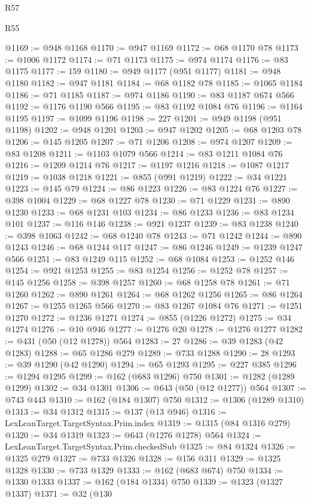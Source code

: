 \begin{lexlean}{R57}
\begin{lexlean}{R55}
\begin{coremodule}
{{{{{{{{{{{{{{{{{{{{{{{{{{{{{{{{{{{{{{{{{{{{{{{{{{{{{{{{{{{{{{@1169 := @948 @1168
@1170 := @947 @1169
@1172 := @68 @1170 @78
@1173 := @1006 @1172
@1174 := @71 @1173
@1175 := @974 @1174
@1176 := @83 @1175
@1177 := 159
@1180 := @949 @1177 (@951 @1177)
@1181 := @948 @1180
@1182 := @947 @1181
@1184 := @68 @1182 @78
@1185 := @1065 @1184
@1186 := @71 @1185
@1187 := @974 @1186
@1190 := @83 @1187 @674 @566
@1192 := @1176 @1190 @566
@1195 := @83 @1192 @1084 @76
@1196 := @1164 @1195
@1197 := @1099 @1196
@1198 := 227
@1201 := @949 @1198 (@951 @1198)
@1202 := @948 @1201
@1203 := @947 @1202
@1205 := @68 @1203 @78
@1206 := @145 @1205
@1207 := @71 @1206
@1208 := @974 @1207
@1209 := @83 @1208
@1211 := @1103 @1079 @566
@1214 := @83 @1211 @1084 @76
@1216 := @1209 @1214 @76
@1217 := @1197 @1216
@1218 := @1087 @1217
@1219 := @1038 @1218
@1221 := @855 (@991 @1219)
@1222 := @34 @1221
@1223 := @145 @79
@1224 := @86 @1223
@1226 := @83 @1224 @76
@1227 := @398 @1004
@1229 := @68 @1227 @78
@1230 := @71 @1229
@1231 := @890 @1230
@1233 := @68 @1231 @103
@1234 := @86 @1233
@1236 := @83 @1234 @101
@1237 := @116 @146
@1238 := @921 @1237
@1239 := @83 @1238
@1240 := @398 @1063
@1242 := @68 @1240 @78
@1243 := @71 @1242
@1244 := @890 @1243
@1246 := @68 @1244 @117
@1247 := @86 @1246
@1249 := @1239 @1247 @566
@1251 := @83 @1249 @115
@1252 := @68 @1084
@1253 := @1252 @146
@1254 := @921 @1253
@1255 := @83 @1254
@1256 := @1252 @78
@1257 := @145 @1256
@1258 := @398 @1257
@1260 := @68 @1258 @78
@1261 := @71 @1260
@1262 := @890 @1261
@1264 := @68 @1262 @1256
@1265 := @86 @1264
@1267 := @1255 @1265 @566
@1270 := @83 @1267 @1084 @76
@1271 := @1251 @1270
@1272 := @1236 @1271
@1274 := @855 (@1226 @1272)
@1275 := @34 @1274
@1276 := @10 @946
@1277 := @1276 @20
@1278 := @1276 @1277
@1282 := @431 (@50 (@12 @1278)) @564
@1283 := 27
@1286 := @39 @1283 (@42 @1283)
@1288 := @65 @1286 @279
@1289 := @733 @1288
@1290 := 28
@1293 := @39 @1290 (@42 @1290)
@1294 := @65 @1293
@1295 := @227 @385
@1296 := @1294 @1295
@1299 := @162 (@683 @1296) @750
@1301 := @1282 (@1289 @1299)
@1302 := @34 @1301
@1306 := @643 (@50 (@12 @1277)) @564
@1307 := @743 @443
@1310 := @162 (@184 @1307) @750
@1312 := @1306 (@1289 @1310)
@1313 := @34 @1312
@1315 := @137 (@13 @946)
@1316 := LexLeanTarget.TargetSyntax.Prim.index
@1319 := @1315 (@84 @1316 @279)
@1320 := @34 @1319
@1323 := @643 (@1276 @1278) @564
@1324 := LexLeanTarget.TargetSyntax.Prim.checkedSub
@1325 := @84 @1324
@1326 := @1325 @279
@1327 := @733 @1326
@1328 := @156 @311
@1329 := @1325 @1328
@1330 := @733 @1329
@1333 := @162 (@683 @674) @750
@1334 := @1330 @1333
@1337 := @162 (@184 @1334) @750
@1339 := @1323 (@1327 @1337)
@1371 := @32
    (@130
}}}}}}}}}}}}}}}}}}}}}}}}}}}}}}}}}}}}}}}}}}}}}}}}}}}}}}}}}}}}}}
\end{coremodule}
\end{lexlean}
\end{lexlean}
